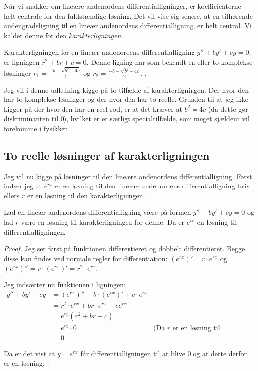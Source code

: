 Når vi snakker om lineære andenordens differentialligninger, er koefficienterne helt centrale for den fuldstændige løsning. 
Det vil vise sig senere, at en tilhørende andengradsligning til en lineær andenordens differentialligning, er helt central. Vi kalder denne for den \textit{karakterligningen}.

\begin{definition}[Karakterligningen]
Karakterligningen for en lineær andenordens differentialligning $y'' + by' + cy = 0$, er ligningen $r^2 + br + c = 0$. 
Denne ligning har som bekendt en eller to komplekse løsninger $r_1 = \frac{-b + \sqrt{b^2 - 4c}}{2}$ og $r_2 = \frac{-b - \sqrt{b^2 - 4c}}{2}$. .
\end{definition}

Jeg vil i denne udledning kigge på to tilfælde af karakterligningen. 
Der hvor den har to komplekse løsninger og der hvor den har to reelle.
Grunden til at jeg ikke kigger på der hvor den har en reel rod, er at det kræver at $b^2 = 4c$ (da dette gør diskriminanten til $0$), hvilket er et særligt specialtilfælde, som meget sjældent vil forekomme i fysikken.

\subsection{To reelle løsninger af karakterligningen}
Jeg vil nu kigge på løsninger til den lineære andenordens differentialligning. 
Først indser jeg at $e^{rx}$ er en løsning til den lineære andenordens differentialligning hvis ellers $r$ er en løsning til den karakterligningen.

\begin{thm}\label{thm: e^rx er en losning}
Lad en lineær andenordens differentialligning være på formen $y'' + by' + cy = 0$ og lad $r$ være en løsning til karakterligningen for denne.
Da er $e^{rx}$ en løsning til differentialligningen. 
\end{thm}

\begin{proof}
Jeg ser først på funktionen differentieret og dobbelt differentieret. Begge disse kan findes ved normale regler for differentiation: 
$(e^{rx})' = r \cdot e^{rx}$ og 
$(e^{rx})'' = r\cdot (e^{rx})' = r^2 \cdot e^{rx}$.

Jeg indsætter nu funktionen i ligningen:
\begin{align*}
y'' + by' + cy 	&= (e^{rx})'' + b\cdot (e^{rx})' + c\cdot e^{rx} \\
				&= r^2 \cdot e^{rx} + br\cdot e^{rx} + c e^{rx} \\
				&= e^{rx} (r^2 + br + c) \\
				&= e^{rx} \cdot 0 		& \text{(Da $r$ er en løsning til karakterligningen)}\\
				&=0
\end{align*}

Da er det vist at $y=e^{rx}$ får differentialligningen til at blive $0$ og at dette derfor er en løsning. 
\end{proof}


